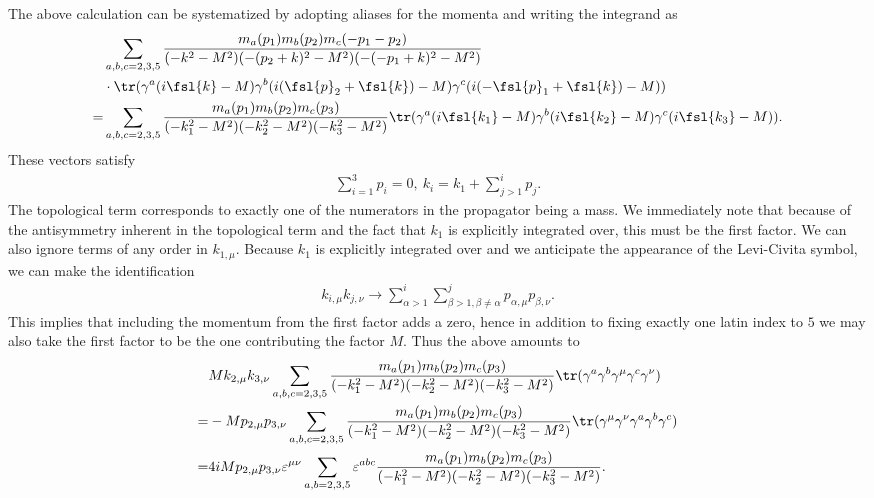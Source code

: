 The above calculation can be systematized by adopting aliases for the momenta and writing the integrand as
\begin{align*}
	 &\sum\limits_{a, b, c = 2, 3, 5}\frac{m_{a}(p_{1})m_{b}(p_{2})m_{c}(-p_{1} - p_{2})}{(-k^{2} - M^{2})(-(p_{2} + k)^{2} - M^{2})(-(-p_{1} + k)^{2} - M^{2})} \\
	 &\cdot\tr(\gamma^{a}(i\fsl{k} - M)\gamma^{b}(i(\fsl{p}_{2} + \fsl{k}) - M)\gamma^{c}(i(-\fsl{p}_{1} + \fsl{k}) - M)) \\
	=& \sum\limits_{a, b, c = 2, 3, 5}\frac{m_{a}(p_{1})m_{b}(p_{2})m_{c}(p_{3})}{(-k_{1}^{2} - M^{2})(-k_{2}^{2} - M^{2})(-k_{3}^{2} - M^{2})}\tr(\gamma^{a}(i\fsl{k_{1}} - M)\gamma^{b}(i\fsl{k_{2}} - M)\gamma^{c}(i\fsl{k_{3}} - M)).
\end{align*}
These vectors satisfy
\begin{align*}
	\sum\limits_{i = 1}^{3}p_{i} = 0,\ k_{i} = k_{1} + \sum\limits_{j > 1}^{i}p_{j}.
\end{align*}
The topological term corresponds to exactly one of the numerators in the propagator being a mass. We immediately note that because of the antisymmetry inherent in the topological term and the fact that $k_{1}$ is explicitly integrated over, this must be the first factor. We can also ignore terms of any order in $k_{1, \mu}$. Because $k_{1}$ is explicitly integrated over and we anticipate the appearance of the Levi-Civita symbol, we can make the identification
\begin{align*}
	k_{i, \mu}k_{j, \nu} \to \sum\limits_{\alpha > 1}^{i}\sum\limits_{\beta > 1, \beta \neq \alpha}^{j}p_{\alpha, \mu}p_{\beta, \nu}.
\end{align*}
This implies that including the momentum from the first factor adds a zero, hence in addition to fixing exactly one latin index to $5$ we may also take the first factor to be the one contributing the factor $M$. Thus the above amounts to
\begin{align*}
	 &Mk_{2, \mu}k_{3, \nu}\sum\limits_{a, b, c = 2, 3, 5}\frac{m_{a}(p_{1})m_{b}(p_{2})m_{c}(p_{3})}{(-k_{1}^{2} - M^{2})(-k_{2}^{2} - M^{2})(-k_{3}^{2} - M^{2})}\tr(\gamma^{a}\gamma^{b}\gamma^{\mu}\gamma^{c}\gamma^{\nu}) \\
	=& -Mp_{2, \mu}p_{3, \nu}\sum\limits_{a, b, c = 2, 3, 5}\frac{m_{a}(p_{1})m_{b}(p_{2})m_{c}(p_{3})}{(-k_{1}^{2} - M^{2})(-k_{2}^{2} - M^{2})(-k_{3}^{2} - M^{2})}\tr(\gamma^{\mu}\gamma^{\nu}\gamma^{a}\gamma^{b}\gamma^{c}) \\
	=& 4iMp_{2, \mu}p_{3, \nu}\varepsilon^{\mu\nu}\sum\limits_{a, b = 2, 3, 5}\varepsilon^{abc}\frac{m_{a}(p_{1})m_{b}(p_{2})m_{c}(p_{3})}{(-k_{1}^{2} - M^{2})(-k_{2}^{2} - M^{2})(-k_{3}^{2} - M^{2})}.
\end{align*}
